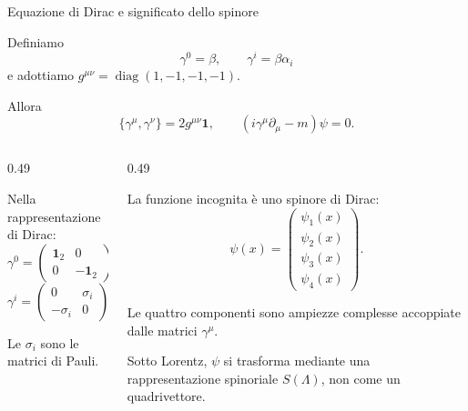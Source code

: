 \begin{frame}{Equazione di Dirac e significato dello spinore}
\small

Definiamo
\[
\gamma^0=\beta,\qquad
\gamma^i=\beta\alpha_i
\]
e adottiamo
$g^{\mu\nu}=\operatorname{diag}(1,-1,-1,-1)$.

Allora
\[
\{\gamma^\mu,\gamma^\nu\}
=2g^{\mu\nu}\mathbf1,
\qquad
(i\gamma^\mu\partial_\mu-m)\psi=0.
\]

\begin{columns}[T,onlytextwidth]
\begin{column}{0.49\textwidth}

Nella rappresentazione di Dirac:
\[
\gamma^0=
\begin{pmatrix}
\mathbf1_2&0\\
0&-\mathbf1_2
\end{pmatrix},
\]
\[
\gamma^i=
\begin{pmatrix}
0&\sigma_i\\
-\sigma_i&0
\end{pmatrix}.
\]

Le $\sigma_i$ sono le matrici di Pauli.

\end{column}
\begin{column}{0.49\textwidth}

La funzione incognita è uno
spinore di Dirac:
\[
\psi(x)=
\begin{pmatrix}
\psi_1(x)\\
\psi_2(x)\\
\psi_3(x)\\
\psi_4(x)
\end{pmatrix}.
\]

Le quattro componenti sono ampiezze
complesse accoppiate dalle matrici
$\gamma^\mu$.

Sotto Lorentz, $\psi$ si trasforma
mediante una rappresentazione spinoriale
$S(\Lambda)$, non come un quadrivettore.

\end{column}
\end{columns}

\end{frame}

